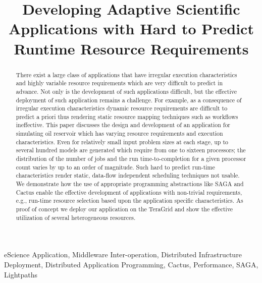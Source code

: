 \documentclass[conference,final]{IEEEtran}
\begin{document}
\title{\large Developing Adaptive Scientific Applications with Hard to
  Predict Runtime Resource Requirements}

\author{  
}
\maketitle

\begin{abstract}
  There exist a large class of applications that have irregular
  execution characteristics and highly variable resource requirements
  which are very difficult to predict in advance.  Not only is the
  development of such applications difficult, but the effective
  deployment of such application remains a challenge.  For example, as
  a consequence of irregular execution characteristics dynamic
  resource requirements are difficult to predict a priori thus
  rendering static resource mapping techniques such as workflows
  ineffective.  This paper discusses the design and development of an
  application for simulating oil reservoir which has varying resource
  requirements and execution characteristics. Even for relatively
  small input problem sizes at each stage, up to several hundred models
  are generated which require from one to sixteen processors; the
  distribution of the number of jobs and the run time-to-completion
  for a given processor count varies by up to an order of magnitude.
  Such hard to predict run-time characteristics render static,
  data-flow independent scheduling techniques not usable. We
  demonstrate how the use of appropriate programming abstractions like
  SAGA and Cactus enable the effective development of applications
  with non-trivial requirements, e.g., run-time resource selection
  based upon the application specific characteristics.  As proof of
  concept we deploy our application on the TeraGrid and show the
  effective utilization of several heterogeneous resources.
\end{abstract}

\begin{keywords}
  eScience Application, Middleware Inter-operation, Distributed
  Infrastructure Deployment, Distributed Application Programming,
  Cactus, Performance, SAGA, Lightpaths
\end{keywords}
\end{document}
